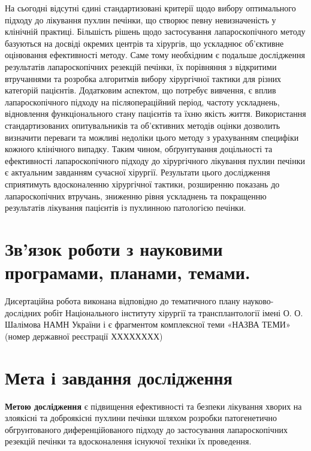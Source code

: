 На сьогодні відсутні єдині стандартизовані критерії щодо вибору оптимального підходу до лікування пухлин печінки, що створює певну невизначеність у клінічній практиці. Більшість рішень щодо застосування лапароскопічного методу базуються на досвіді окремих центрів та хірургів, що ускладнює об’єктивне оцінювання ефективності методу. Саме тому необхідним є подальше дослідження результатів лапароскопічних резекцій печінки, їх порівняння з відкритими втручаннями та розробка алгоритмів вибору хірургічної тактики для різних категорій пацієнтів.
Додатковим аспектом, що потребує вивчення, є вплив лапароскопічного підходу на післяопераційний період, частоту ускладнень, відновлення функціонального стану пацієнтів та їхню якість життя. Використання стандартизованих опитувальників та об’єктивних методів оцінки дозволить визначити переваги та можливі недоліки цього методу з урахуванням специфіки кожного клінічного випадку.
Таким чином, обґрунтування доцільності та ефективності лапароскопічного підходу до хірургічного лікування пухлин печінки є актуальним завданням сучасної хірургії. Результати цього дослідження сприятимуть вдосконаленню хірургічної тактики, розширенню показань до лапароскопічних втручань, зниженню рівня ускладнень та покращенню результатів лікування пацієнтів із пухлинною патологією печінки.


\section{Зв’язок роботи з науковими програмами, планами, темами.}

Дисертаційна робота виконана відповідно до тематичного плану науково-дослідних робіт Національного інституту хірургії та трансплантології імені О. О. Шалімова НАМН України і є фрагментом комплексної теми «НАЗВА ТЕМИ» (номер державної реєстрації ХХХХХХХХ)

\section{Мета і завдання дослідження} 


\textbf{Метою дослідження} є підвищення ефективності та безпеки лікування хворих на злоякісні та доброякісні пухлини печінки шляхом розробки патогенетично обгрунтованого диференційованого підходу до застосування лапароскопічних резекцій печінки та вдосконалення існуючої техніки їх проведення.



